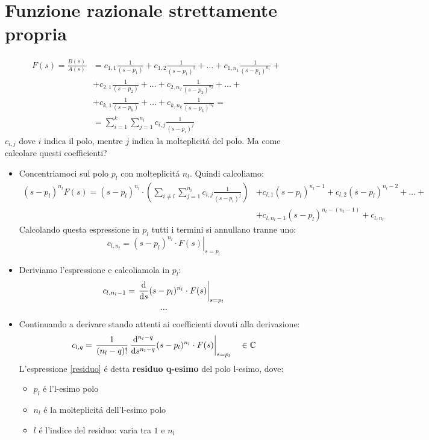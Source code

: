 \documentclass[../main.tex]{subfiles}
\begin{document}
	\section{Funzione razionale strettamente propria}
	\begin{align*}
		F(s) = \frac{B(s)}{A(s)} &= c_{1,1} \frac{1}{(s-p_1)} + c_{1,2} \frac{1}{(s-p_1)^2} + \dots + c_{1,n_1} \frac{1}{(s-p_1)^{n_1}} +\\
		&+ c_{2,1} \frac{1}{(s-p_2)} + \dots + c_{2,n_2} \frac{1}{(s-p_2)^{n_2}} + \dots + \\
		&+ c_{k,1} \frac{1}{(s-p_k)} + \dots + c_{k,n_k} \frac{1}{(s-p_k)^{n_k}} =\\
		&= \sum_{i=1}^{k} \sum_{j=1}^{n_i} c_{i,j} \frac{1}{(s-p_i)^j}
	\end{align*}
	$c_{i,j}$ dove $i$ indica il polo, mentre $j$ indica la molteplicit\'{a} del polo. Ma come calcolare questi coefficienti?\\
	\begin{itemize}
		\item Concentriamoci sul polo $p_l$ con molteplicit\'{a} $n_l$. Quindi calcoliamo:
		\begin{align*}
			(s-p_l)^{n_l} F(s) = (s-p_l)^{n_l} \cdot \left( \sum_{i \neq l} \sum_{j=1}^{n_i} c_{i,j} \frac{1}{(s-p_i)^j} \right) &+ c_{l,1} (s-p_l)^{n_l -1} + c_{l,2} (s-p_l)^{n_l -2} + \dots +\\
			&+ c_{l,n_l -1} (s-p_l)^{n_l - (n_l -1)} + c_{l,n_l}
		\end{align*}
		Calcolando questa espressione in $p_l$ tutti i termini si annullano tranne uno:
		\[ c_{l,n_l} = \left. (s-p_l)^{n_l} \cdot F(s) \right|_{s=p_l} \]
		\item Deriviamo l'espressione e calcoliamola in $p_l$:
		\[ c_{l,n_l-1} = \left. \frac{\mathrm{d} }{\mathrm{d} s} (s-p_l)^{n_l} \cdot F(s) \right|_{s=p_l} \]
		\linebreak
		\[ \dots \]
		\linebreak
		\item Continuando a derivare stando attenti ai coefficienti dovuti alla derivazione:
		\begin{equation}
		\label{residuo}
			c_{l,q} = \left. \frac{1}{(n_l - q)!}\: \frac{\mathrm{d} {}^{n_l - q}}{\mathrm{d} s^{n_l - q}} (s-p_l)^{n_l} \cdot F(s) \right|_{s=p_l} \quad \in \mathbb{C}
		\end{equation}
		L'espressione \ref{residuo} \'{e} detta \textbf{residuo q-esimo} del polo l-esimo, dove:
		\begin{itemize}
			\item $ p_l $ \'{e} l'l-esimo polo
			\item $ n_l $ \'{e} la molteplicit\'{a} dell'l-esimo polo
			\item $ l $ \'{e} l'indice del residuo: varia tra $ 1 $ e $ n_l $
		\end{itemize}
	\end{itemize}
\end{document}
